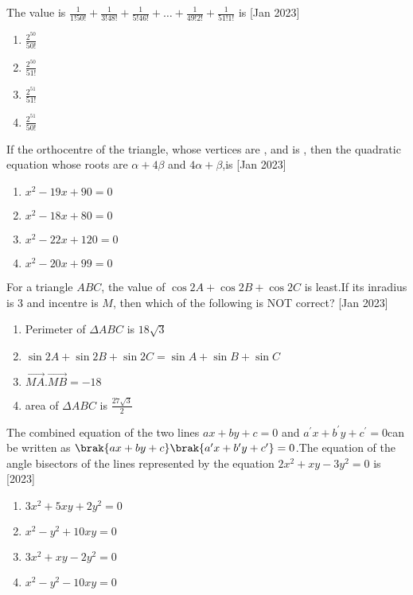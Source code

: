 \item The value is $\frac{1}{1!50!}+\frac{1}{3!48!}+\frac{1}{5!46!}+\dots+\frac{1}{49!2!}+\frac{1}{51!1!}$ is 
	\hfill{[Jan 2023]}
\begin{multicols}{2}
\begin{enumerate}
\item $\frac{2^{50}}{50!}$
\item $\frac{2^{50}}{51!}$
\item $\frac{2^{51}}{51!}$
\item $\frac{2^{51}}{50!}$
\end{enumerate}
\end{multicols}
\item If the orthocentre of the triangle, whose vertices are , and  is \brak{\alpha,\beta}, then the quadratic equation whose roots are $\alpha +4\beta$ and $4\alpha +\beta$,is 
	\hfill{[Jan 2023]}
\begin{enumerate}
\item $x^2-19x+90=0$
\item $x^2-18x+80=0$
\item $x^2-22x+120=0$
\item $x^2-20x+99=0$
\end{enumerate}
\item For a triangle $ABC$, the value of $\cos{2A}+\cos{2B}+\cos{2C}$ is least.If its inradius is 3 and incentre is $M$, then which of the following is NOT correct? 
	\hfill{[Jan 2023]}
\begin{enumerate}
\item Perimeter of $\Delta ABC$ is $18\sqrt{3}$
\item $\sin{2A}+\sin{2B}+\sin{2C}=\sin{A}+\sin{B}+\sin{C}$
\item $\overrightarrow{MA}.\overrightarrow{MB}=-18$
\item area of $\Delta ABC$ is $\frac{27\sqrt{3}}{2}$
\end{enumerate}
\item The combined equation of the two lines $ax+by+c=0$ and $a^\prime x+b^\prime y+c^\prime=0$can be written as $\brak{ax+by+c}\brak{a^\prime x+b^\prime y+c^\prime}=0$.The equation of the angle bisectors of the lines represented by the equation $2x^2+xy-3y^2=0$ is 
	\hfill{[2023]}
\begin{enumerate}
\item $3x^2+5xy+2y^2=0$
\item $x^2-y^2+10xy=0$
\item $3x^2+xy-2y^2=0$
\item $x^2-y^2-10xy=0$    
\end{enumerate}
